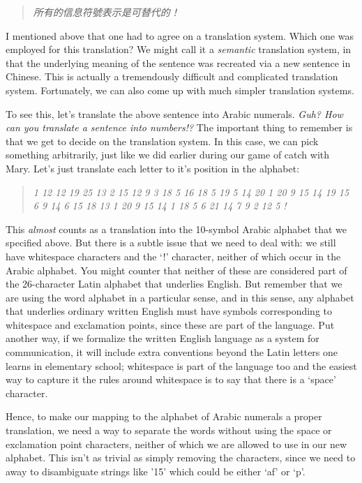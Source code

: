 \documentclass[UTF8]{book}
\begin{document}
\begin{CJK}{UTF8}{gbsn}
\begin{quotation}
\centering
\emph{所有的信息符號表示是可替代的！}
\end{quotation}

I mentioned above that one had to agree on a translation system.  Which one was employed for this translation? We might call it a \emph{semantic} translation system, in that the underlying meaning of the sentence was recreated via a new sentence in Chinese. This is actually a tremendously difficult and complicated translation system. Fortunately, we can also come up with much simpler translation systems.

To see this, let's translate the above sentence into Arabic numerals. \emph{Guh? How can you translate a sentence into numbers!?} The important thing to remember is that we get to decide on the translation system. In this case, we can pick something arbitrarily, just like we did earlier during our game of catch with Mary. Let's just translate each letter to it's position in the alphabet:

\begin{quotation}
\centering
\emph{1 12 12  19 25 13 2 15 12 9 3  18 5 16 18 5 19 5 14 20 1 20 9 15 14 19  15 6  9 14 6 15 18 13 1 20 9 15 14  1 18 5  6 21 14 7 9 2 12 5 !}
\end{quotation}

This \emph{almost} counts as a translation into the 10-symbol Arabic alphabet that we specified above. But there is a subtle issue that we need to deal with: we still have whitespace characters and the `!' character, neither of which occur in the Arabic alphabet. You might counter that neither of these are considered part of the 26-character Latin alphabet that underlies English. But remember that we are using the word alphabet in a particular sense, and in this sense, any alphabet that underlies ordinary written English must have symbols corresponding to whitespace and exclamation points, since these are part of the language. Put another way, if we formalize the written English language as a system for communication, it will include extra conventions beyond the Latin letters one learns in elementary school; whitespace is part of the language too and the easiest way to capture it the rules around whitespace is to say that there is a `space' character.

Hence, to make our mapping to the alphabet of Arabic numerals a proper translation, we need a way to separate the words without using the space or exclamation point characters, neither of which we are allowed to use in our new alphabet. This isn't as trivial as simply removing the characters, since we need to away to disambiguate strings like '15' which could be either `af' or `p'.


\end{CJK}
\end{document}
